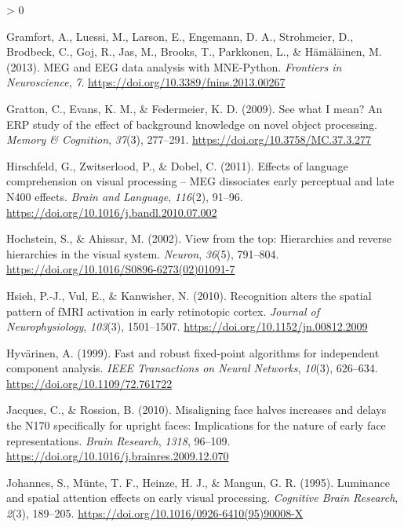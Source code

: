 \documentclass[
  english,
  doc,12pt,twoside,floatsintext]{apa7}
\newlength{\cslhangindent}
\newenvironment{CSLReferences}[2] %
 {%
  \setlength{\parindent}{0pt}
  \ifodd #1 \everypar{\setlength{\hangindent}{\cslhangindent}}\ignorespaces\fi
  \ifnum #2 > 0
  \setlength{\parskip}{#2\baselineskip}
  \fi
 }%
 {}
\begin{document}
\begin{CSLReferences}{1}{0}
\leavevmode\hypertarget{ref-gramfort2013}{}%
Gramfort, A., Luessi, M., Larson, E., Engemann, D. A., Strohmeier, D., Brodbeck, C., Goj, R., Jas, M., Brooks, T., Parkkonen, L., \& Hämäläinen, M. (2013). MEG and {EEG} data analysis with {MNE-Python}. \emph{Frontiers in Neuroscience}, \emph{7}. \url{https://doi.org/10.3389/fnins.2013.00267}

\leavevmode\hypertarget{ref-gratton2009}{}%
Gratton, C., Evans, K. M., \& Federmeier, K. D. (2009). See what {I} mean? An {ERP} study of the effect of background knowledge on novel object processing. \emph{Memory \& Cognition}, \emph{37}(3), 277--291. \url{https://doi.org/10.3758/MC.37.3.277}

\leavevmode\hypertarget{ref-hirschfeld2011}{}%
Hirschfeld, G., Zwitserlood, P., \& Dobel, C. (2011). Effects of language comprehension on visual processing -- MEG dissociates early perceptual and late N400 effects. \emph{Brain and Language}, \emph{116}(2), 91--96. \url{https://doi.org/10.1016/j.bandl.2010.07.002}

\leavevmode\hypertarget{ref-hochstein2002}{}%
Hochstein, S., \& Ahissar, M. (2002). View from the top: Hierarchies and reverse hierarchies in the visual system. \emph{Neuron}, \emph{36}(5), 791--804. \url{https://doi.org/10.1016/S0896-6273(02)01091-7}

\leavevmode\hypertarget{ref-hsieh2010}{}%
Hsieh, P.-J., Vul, E., \& Kanwisher, N. (2010). Recognition alters the spatial pattern of {fMRI} activation in early retinotopic cortex. \emph{Journal of Neurophysiology}, \emph{103}(3), 1501--1507. \url{https://doi.org/10.1152/jn.00812.2009}

\leavevmode\hypertarget{ref-hyvuxe4rinen1999}{}%
Hyvärinen, A. (1999). Fast and robust fixed-point algorithms for independent component analysis. \emph{IEEE Transactions on Neural Networks}, \emph{10}(3), 626--634. \url{https://doi.org/10.1109/72.761722}

\leavevmode\hypertarget{ref-jacques2010}{}%
Jacques, C., \& Rossion, B. (2010). Misaligning face halves increases and delays the {N170} specifically for upright faces: Implications for the nature of early face representations. \emph{Brain Research}, \emph{1318}, 96--109. \url{https://doi.org/10.1016/j.brainres.2009.12.070}

\leavevmode\hypertarget{ref-johannes1995}{}%
Johannes, S., Münte, T. F., Heinze, H. J., \& Mangun, G. R. (1995). Luminance and spatial attention effects on early visual processing. \emph{Cognitive Brain Research}, \emph{2}(3), 189--205. \url{https://doi.org/10.1016/0926-6410(95)90008-X}


\end{CSLReferences}
\end{document}
